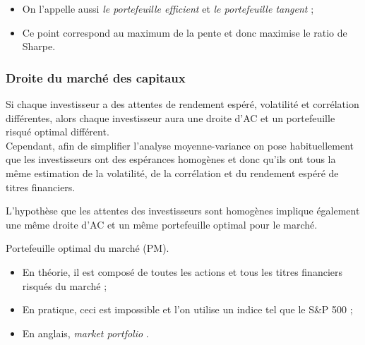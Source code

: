 \documentclass[10pt, french]{article}
\begin{document}
\begin{multicols*}{2}
\begin{center}
\end{center}

\begin{itemize}
	\item	On l'appelle aussi \textit{le portefeuille efficient} et \textit{le portefeuille tangent} ;
	\item	Ce point correspond au maximum de la pente et donc maximise le ratio de Sharpe.
\end{itemize}


\columnbreak
\subsubsection{Droite du marché des capitaux}
\begin{rappel_enhanced}[Contexte]
Si chaque investisseur a des attentes de rendement espéré, volatilité et corrélation différentes, alors chaque investisseur aura une droite d'AC et un portefeuille risqué optimal différent.\\

Cependant, afin de simplifier l'analyse moyenne-variance on pose habituellement que les investisseurs ont des espérances homogènes et donc qu'ils ont tous la même estimation de la volatilité, de la corrélation et du rendement espéré de titres financiers.
\end{rappel_enhanced}

L'hypothèse que les attentes des investisseurs sont homogènes implique également une même droite d'AC et un même portefeuille optimal pour le marché.

\begin{definitionNOHFILL}
Portefeuille optimal du marché (PM).
\begin{itemize}
	\item	En théorie, il est composé de toutes les actions et tous les titres financiers risqués du marché ;
	\item	En pratique, ceci est impossible et l'on utilise un indice tel que le S\&P 500 ;
	\item	En anglais, \og \textit{market portfolio} \fg{}.
\end{itemize}
\end{definitionNOHFILL}


\end{multicols*}
\end{document}
